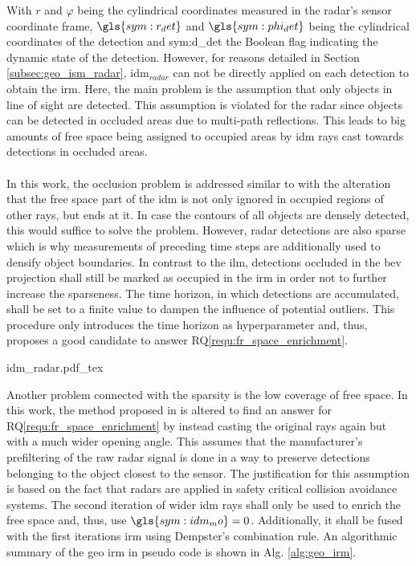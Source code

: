 With $r$ and $\varphi$ being the cylindrical coordinates measured in the radar's sensor coordinate frame, $\gls{sym:r_det}$ and $\gls{sym:phi_det}$ being the cylindrical  coordinates of the detection and \gls{sym:d_det} the Boolean flag indicating the dynamic state of the detection. However, for reasons detailed in Section \ref{subsec:geo_ism_radar}, \gls{idm}$_{radar}$ can not be directly applied on each detection to obtain the \gls{irm}. Here, the main problem is the assumption that only objects in line of sight are detected. This assumption is violated for the radar since objects can be detected in occluded areas due to multi-path reflections. This leads to big amounts of free space being assigned to occupied areas by \gls{idm} rays cast towards detections in occluded areas. 
\\\\
In this work, the occlusion problem is addressed similar to \cite{werber2015automotive} with the alteration that the free space part of the \gls{idm} is not only ignored in occupied regions of other rays, but ends at it. In case the contours of all objects are densely detected, this would suffice to solve the problem. However, radar detections are also sparse which is why measurements of preceding time steps are additionally used to densify object boundaries. In contrast to the \gls{ilm}, detections occluded in the \gls{bev} projection shall still be marked as occupied in the \gls{irm} in order not to further increase the sparseness. The time horizon, in which detections are accumulated, shall be set to a finite value to dampen the influence of potential outliers. This procedure only introduces the time horizon as hyperparameter and, thus, proposes a good candidate to answer RQ\ref{requ:fr_space_enrichment}.
\begin{center}
	{idm_radar.pdf_tex}
\end{center}
Another problem connected with the sparsity is the low coverage of free space. In this work, the method proposed in \cite{prophet2018adaptions} is altered to find an answer for RQ\ref{requ:fr_space_enrichment} by instead casting the original rays again but with a much wider opening angle. This assumes that the manufacturer's prefiltering of the raw radar signal is done in a way to preserve detections belonging to the object closest to the sensor. The justification for this assumption is based on the fact that radars are applied in safety critical collision avoidance systems. The second iteration of wider \gls{idm} rays shall only be used to enrich the free space and, thus, use $\gls{sym:idm_mo} = 0$. Additionally, it shall be fused with the first iterations \gls{irm} using Dempster's combination rule. An algorithmic summary of the geo \gls{irm} in pseudo code is shown in Alg. \ref{alg:geo_irm}.
